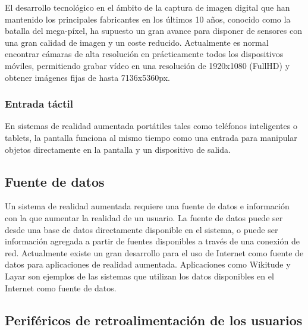 El desarrollo tecnológico en el ámbito de la captura de imagen digital que han mantenido los principales fabricantes en los últimos 10 años, conocido como la batalla del mega-píxel, ha supuesto un gran avance para disponer de sensores con una gran calidad de imagen y un coste reducido. Actualmente es normal encontrar cámaras de alta resolución en prácticamente todos los dispositivos móviles, permitiendo grabar vídeo en una resolución de 1920x1080 (FullHD) y obtener imágenes fijas de hasta 7136x5360px.

\subsubsection{Entrada táctil}
En sistemas de realidad aumentada portátiles tales como teléfonos inteligentes o tablets, la pantalla funciona al mismo tiempo como una entrada para manipular objetos directamente en la pantalla y un dispositivo de salida.

\subsection{Fuente de datos}
Un sistema de realidad aumentada requiere una fuente de datos e información con la que aumentar la realidad de un usuario. La fuente de datos puede ser desde una base de datos directamente disponible en el sistema, o puede ser información agregada a partir de fuentes disponibles a través de una conexión de red. Actualmente existe un gran desarrollo para el uso de Internet como fuente de datos para aplicaciones de realidad aumentada. Aplicaciones como Wikitude y Layar son ejemplos de las sistemas que utilizan los datos disponibles en el Internet como fuente de datos.

\subsection{Periféricos de retroalimentación de los usuarios}
